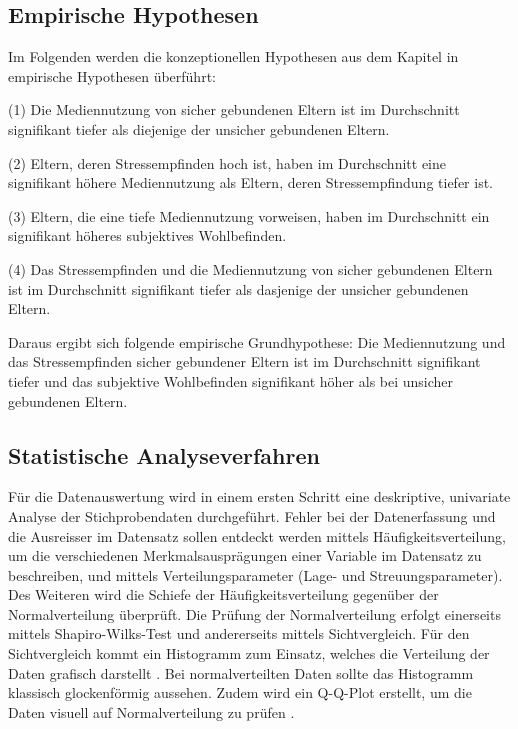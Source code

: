 \subsection{Empirische Hypothesen}\label{sec:EmpirischeHypothesen}
Im Folgenden werden die konzeptionellen Hypothesen aus dem Kapitel \textit{} in empirische Hypothesen überführt:

(1) Die Mediennutzung von sicher gebundenen Eltern ist im Durchschnitt signifikant tiefer als diejenige der unsicher gebundenen Eltern.

(2) Eltern, deren Stressempfinden hoch ist, haben im Durchschnitt eine signifikant höhere Mediennutzung als Eltern, deren Stressempfindung tiefer ist.

(3) Eltern, die eine tiefe Mediennutzung vorweisen, haben im Durchschnitt ein signifikant höheres subjektives Wohlbefinden.

(4) Das Stressempfinden und die Mediennutzung von sicher gebundenen Eltern ist im Durchschnitt signifikant tiefer als dasjenige der unsicher gebundenen Eltern.

Daraus ergibt sich folgende empirische Grundhypothese: Die Mediennutzung und das Stressempfinden sicher gebundener Eltern ist im Durchschnitt signifikant tiefer und das subjektive Wohlbefinden signifikant höher als bei unsicher gebundenen Eltern.


\subsection{Statistische Analyseverfahren}
Für die Datenauswertung wird in einem ersten Schritt eine deskriptive, univariate Analyse der Stichprobendaten durchgeführt. Fehler bei der Datenerfassung und die Ausreisser im Datensatz sollen entdeckt werden mittels Häufigkeitsverteilung, um die verschiedenen Merkmalsausprägungen einer Variable im Datensatz zu beschreiben, und mittels Verteilungsparameter (Lage- und Streuungsparameter). Des Weiteren wird die Schiefe der Häufigkeitsverteilung gegenüber der Normalverteilung überprüft. Die Prüfung der Normalverteilung erfolgt einerseits mittels Shapiro-Wilks-Test \cite{Shapiro1965} und andererseits mittels Sichtvergleich. Für den Sichtvergleich kommt ein Histogramm zum Einsatz, welches die Verteilung der Daten grafisch darstellt \cite{Hemmerich2018}. Bei normalverteilten Daten sollte das Histogramm klassisch glockenförmig aussehen. Zudem wird ein Q-Q-Plot erstellt, um die Daten visuell auf Normalverteilung zu prüfen \cite{Hemmerich2018}. 

